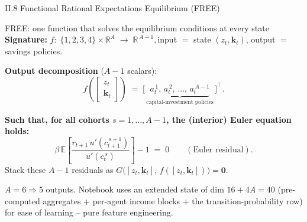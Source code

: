 \documentclass[aspectratio=169,11pt]{beamer}
\newcommand{\R}{\mathbb{R}}
\newcommand{\E}[1]{\mathbb{E}\!\left[#1\right]}
\begin{document}
\begin{frame}{II.8 Functional Rational Expectations Equilibrium (FREE)}
\footnotesize
\begin{exampleblock}{FREE: one function that solves the equilibrium conditions at every state}
\vspace{-2pt}
\textbf{Signature:}\;
$
f:\;\{1,2,3,4\}\times \R^{A} \;\longrightarrow\; \R^{\,A-1},
$\quad input $=$ state $(z_t, \bm{k}_t)$, output $=$ savings policies.

\vspace{2pt}
\textbf{Output decomposition} ($A-1$ scalars):
\[
f\!\left(\!\begin{bmatrix} z_t \\ \bm{k}_t \end{bmatrix}\!\right)
\;=\;
\bigl[\,\underbrace{a_t^{\,1},\,a_t^{\,2},\,\ldots,\,a_t^{\,A-1}}_{\text{capital-investment policies}}\,\bigr]^{\!\top}.
\]
\end{exampleblock}

\textbf{Such that, for all cohorts $s = 1, \ldots, A-1$, the (interior) Euler equation holds:}
\[
\beta\,\E{\frac{r_{t+1}\,u'(c_{t+1}^{\,s+1})}{u'(c_t^{\,s})}} - 1 \;=\; 0 \qquad (\text{Euler residual}).
\]
Stack these $A-1$ residuals as $G\bigl([z_t, \bm{k}_t],\, f([z_t, \bm{k}_t])\bigr) = \bm{0}$.

{\scriptsize $A=6 \Rightarrow 5$ outputs.  Notebook uses an extended state of dim $16+4A=40$ (pre-computed aggregates + per-agent income blocks + the transition-probability row) for ease of learning -- pure feature engineering.}
\end{frame}
\end{document}
